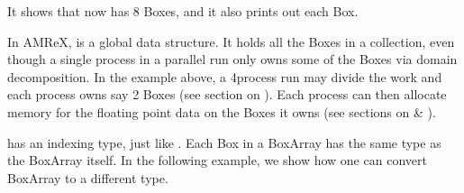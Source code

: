 \documentclass[letterpaper,10pt,english]{sphinxmanual}
\begin{document}
\sphinxAtStartPar
It shows that  now has 8 Boxes, and it also prints out each Box.

\sphinxAtStartPar
In AMReX,  is a global data structure. It holds all the Boxes in
a collection, even though a single process in a parallel run only owns some of
the Boxes via domain decomposition. In the example above, a 4\sphinxhyphen{}process run may
divide the work and each process owns say 2 Boxes (see section
on {\hyperref[\detokenize{Basics:sec-basics-dm}]{}}). Each process can then allocate memory for the
floating point data on the Boxes it owns (see sections
on {\hyperref[\detokenize{Basics:sec-basics-multifab}]{}} \& {\hyperref[\detokenize{Basics:sec-basics-fab}]{}}).

\sphinxAtStartPar
{} has an indexing type, just like . Each Box in a
BoxArray has the same type as the BoxArray itself. In the following example, we
show how one can convert BoxArray to a different type.
\end{document}
